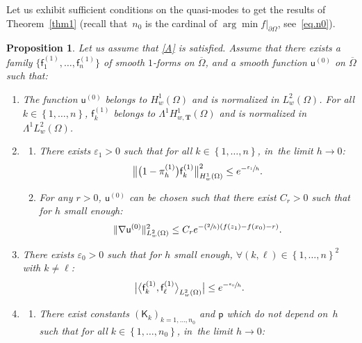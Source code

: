 \documentclass[10pt]{amsart}
\newcommand{\Psfrac}[2]{(\sfrac{#1}{#2})}
\newcommand{\mbf}[1]{\mathbf{#1}}
\let\lp\langle
\let\rp\rangle
\let\ve\varepsilon
\theoremstyle{plain}
\newtheorem{proposition}{Proposition}
\theoremstyle{definition}
\begin{document}
\label{sec.strategy0}

Let us exhibit sufficient conditions on the quasi-modes to get the
results of Theorem~\ref{thm1} (recall that~$n_0$ is the cardinal of
$\arg\min f|_{\partial \Omega}$, see~\eqref{eq.n0}).

\begin{proposition} \label{ESTIME}
Let us assume that \ref{A} is satisfied.
Assume that there exists a family $\{\mathsf f_1^{(1)}, \ldots,
\mathsf f_n^{(1)}\} $ of smooth $1$-forms on $\overline \Omega$, and
a smooth function $\mathsf u^{(0)}$ on $\overline \Omega$ such that:
\begin{enumerate}
\item\label{ESTIME1}
The function $\mathsf u^{(0)}$ belongs to $H^1_w(\Omega)$ and is normalized in $L^2_w(\Omega)$.
For all $ k\in \left\{1,\ldots,n\right\}$, $\mathsf f_k^{(1)}$
belongs to $\Lambda^1H^1_{w,\mbf T}(\Omega)$ and is normalized in $\Lambda^1L^2_w(\Omega)$.
\item\mbox{}
\begin{enumerate}
\item\label{ESTIME2a}
There exists $\ve_1>0$ such that for all $ k\in \left\{1,\ldots,n\right\}$, in~the limit $h\to 0$:
\begin{equation}\label{eq:assump_2a_psi}
\big \| \bigl(1-\pi_h^{(1)}\bigr) \mathsf f_k^{(1)} \big \|_{H^1_{w}(\Omega)}^2 \le e^{-\sfrac{\ve_1}{h}}.
\end{equation}
\item\label{ESTIME2b}
For any $r>0$, $\mathsf u^{(0)}$ can be chosen such that there exist $C_r>0$ such that for $h$ small enough:
\[
\| \nabla \mathsf u^{(0)}\|_{L^2_w(\Omega)}^2 \le C_r e^{-\Psfrac{2}{h}(f(z_1)-f(x_0) - r)}.
\]
\end{enumerate}
\item\label{ESTIME3}
There exists $\ve_0>0$ such that for $h$ small enough, $\forall (k,\ell)
\in \left\{1,\ldots,n\right\}^2$ with $k\neq \ell$:
\[
\big\vert \big\lp\mathsf f_k^{(1)}, \mathsf f_\ell^{(1)}\big\rp_{L^2_w(\Omega)}\big\vert \le e^{-\sfrac{\ve_0}{h}}.
\]
\item\mbox{}\label{ESTIME4}
\begin{enumerate}
\item\label{ESTIME4a}
There exist constants
$(\mathsf K_k)_{k=1,\ldots,n_0}$ and $\mathsf p$ which do not depend on~$h$ such that for all $k\in \left\{1,\ldots,n_0\right\}$, in~the limit $h\to 0$:

\end{enumerate}
\end{enumerate}
\end{proposition}
\end{document}
